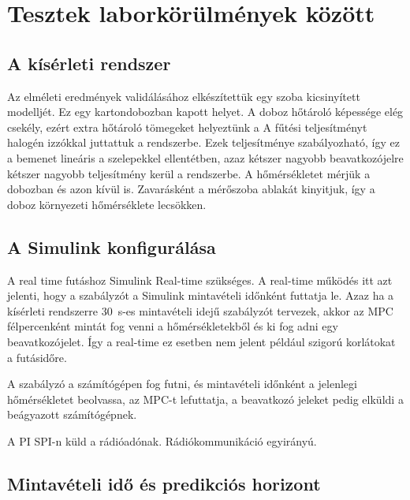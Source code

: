 \chapter{Tesztek laborkörülmények között}

\section{A kísérleti rendszer}
Az elméleti eredmények validálásához elkészítettük egy szoba kicsinyített modelljét. Ez egy kartondobozban kapott helyet. A doboz hőtároló képessége elég csekély, ezért extra hőtároló tömegeket helyeztünk a 
A fűtési teljesítményt halogén izzókkal juttattuk a rendszerbe. Ezek teljesítménye szabályozható, így ez a bemenet lineáris a szelepekkel ellentétben, azaz kétszer nagyobb beavatkozójelre kétszer nagyobb teljesítmény kerül a rendszerbe.
A hőmérsékletet mérjük a dobozban és azon kívül is. Zavarásként a mérőszoba ablakát kinyitjuk, így a doboz környezeti hőmérséklete lecsökken.

\section{A Simulink konfigurálása}
A real time futáshoz Simulink  Real-time szükséges. A real-time működés itt azt jelenti, hogy a szabályzót a Simulink mintavételi időnként futtatja le. Azaz ha a kísérleti rendszerre \SI{30}{\second}-es mintavételi idejű szabályzót tervezek, akkor az MPC félpercenként mintát fog venni a hőmérsékletekből és ki fog adni egy beavatkozójelet. Így a real-time ez esetben nem jelent például szigorú korlátokat a futásidőre.



A szabályzó a számítógépen fog futni, és mintavételi időnként a jelenlegi hőmérsékletet beolvassa, az MPC-t lefuttatja, a beavatkozó jeleket pedig elküldi a beágyazott számítógépnek.





A PI SPI-n küld a rádióadónak.
Rádiókommunikáció egyirányú.

\section{Mintavételi idő és predikciós horizont}

